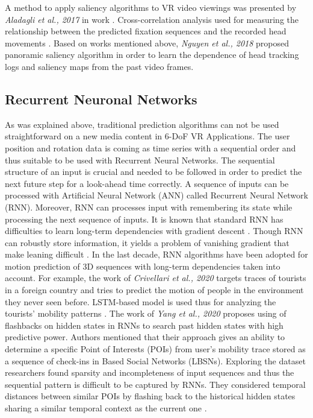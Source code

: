 A method to apply saliency algorithms to VR video viewings was presented by \textit{Aladagli et al., 2017} in work \cite{predicting_360}. Cross-correlation analysis used for measuring the relationship between the predicted fixation sequences and the recorded head movements \cite{predicting_360}. Based on works mentioned above, \textit{Nguyen et al., 2018} proposed panoramic saliency algorithm in order to learn the dependence of head tracking logs and saliency maps from the past video frames.\\

\subsection{Recurrent Neuronal Networks}
\label{sec:related:deep}
As was explained above, traditional prediction algorithms can not be used straightforward on a new media content in 6-DoF VR Applications. The user position and rotation data is coming as time series with a sequential order and thus suitable to be used with Recurrent Neural Networks. The sequential structure of an input is crucial and needed to be followed in order to predict the next future step for a look-ahead time correctly. A sequence of inputs can be processed with Artificial Neural Network (ANN) called Recurrent Neural Network (RNN). Moreover, RNN can processes input with remembering its state while processing the next sequence of inputs. It is known that standard RNN has difficulties to learn long-term dependencies with gradient descent \cite{rnn_difficults}. Though RNN can robustly store information, it yields a problem of vanishing gradient that make leaning difficult \cite{rnn_difficults}. In the last decade, RNN algorithms have been adopted for motion prediction of 3D sequences with long-term dependencies taken into account. For example, the work of \textit{Crivellari et al., 2020} targets traces of tourists in a foreign country and tries to predict the motion of people in the environment they never seen before. LSTM-based model is used thus for analyzing the tourists’ mobility patterns \cite{tourist_traces}. The work of \textit{Yang et al., 2020} proposes using of flashbacks on hidden states in RNNs to search past hidden states with high predictive power. Authors mentioned that their approach gives an ability to determine a specific Point of Interests (POIs) from user’s mobility trace stored as a sequence of check-ins in Based Social Networks (LBSNs). Exploring the dataset researchers found sparsity and incompleteness of input sequences and thus the sequential pattern is difficult to be captured by RNNs. They considered temporal distances between similar POIs by flashing back to the historical hidden states sharing a similar temporal context as the current one \cite{rnn_traces_hidden}. \\
